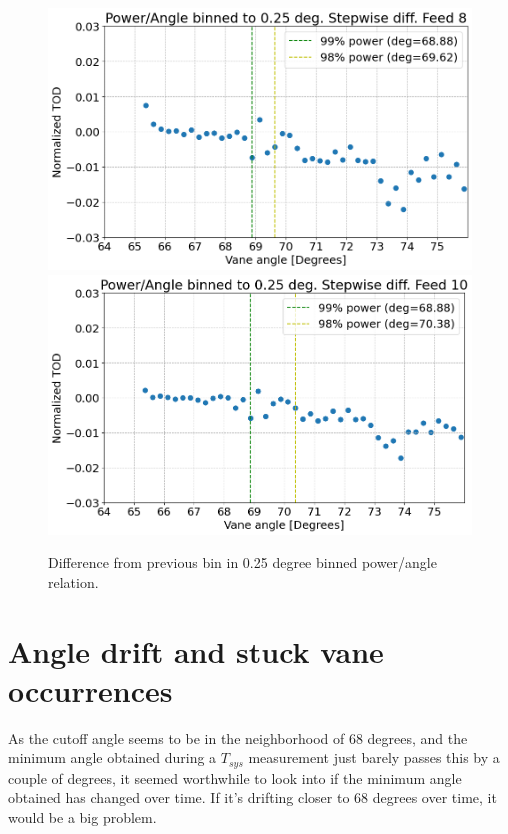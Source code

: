 \documentclass[10pt, a4paper]{article}
\begin{document}
\vspace{1cm}
\begin{figure}[H]
    \centering
    \includegraphics[scale=0.37]{../plots/binned_diff8.png}
    \includegraphics[scale=0.37]{../plots/binned_diff10.png}
    \caption{Difference from previous bin in 0.25 degree binned power/angle relation.}
    \label{fig:8and10_diff}
\end{figure}


\section{Angle drift and stuck vane occurrences}
As the cutoff angle seems to be in the neighborhood of 68 degrees, and the minimum angle obtained during a $T_{sys}$ measurement just barely passes this by a couple of degrees, it seemed worthwhile to look into if the minimum angle obtained has changed over time. If it's drifting closer to 68 degrees over time, it would be a big problem.
\end{document}
